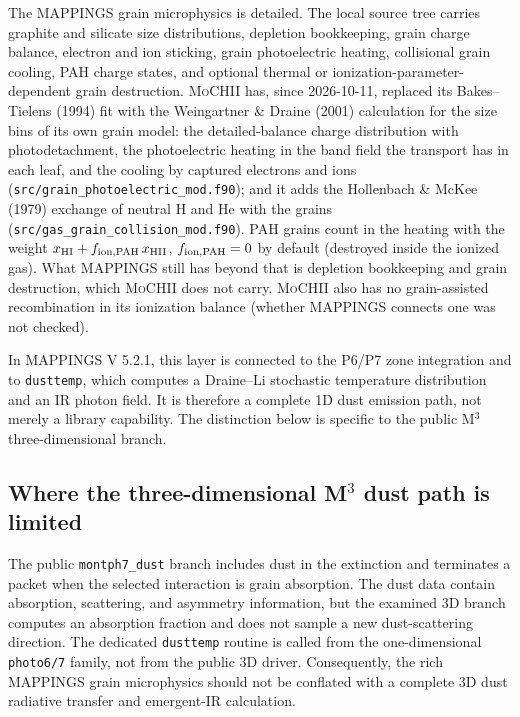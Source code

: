 \documentclass[english,a4paper]{my_memo}
\newcommand{\code}[1]{\texttt{#1}}
\newcommand{\MoCHII}{\textsc{MoCHII}}
\newcommand{\Mthree}{M$^3$}
\newcommand{\Mappings}{MAPPINGS V 5.2.1}
\begin{document}
The MAPPINGS grain microphysics is detailed.  The local source tree carries
graphite and silicate size distributions, depletion bookkeeping, grain
charge balance, electron and ion sticking, grain photoelectric heating,
collisional grain cooling, PAH charge states, and optional thermal or
ionization-parameter-dependent grain destruction.  \MoCHII{} has, since
2026-10-11, replaced its Bakes--Tielens (1994) fit with the Weingartner \&
Draine (2001) calculation for the size bins of its own grain model: the
detailed-balance charge distribution with photodetachment, the
photoelectric heating in the band field the transport has in each leaf, and
the cooling by captured electrons and ions (\code{src/grain\_photoelectric\_mod.f90});
and it adds the Hollenbach \& McKee (1979) exchange of neutral H and He with
the grains (\code{src/gas\_grain\_collision\_mod.f90}).  PAH grains count in
the heating with the weight $x_{\rm HI} + f_{\rm ion,PAH}\,x_{\rm HII}$,
$f_{\rm ion,PAH} = 0$ by default (destroyed inside the ionized gas).  What
MAPPINGS still has beyond that is depletion bookkeeping and grain
destruction, which \MoCHII{} does not carry.  \MoCHII{} also has no
grain-assisted recombination in its ionization balance (whether MAPPINGS
connects one was not checked).

In \Mappings{}, this layer is connected to the P6/P7 zone integration and
to \code{dusttemp}, which computes a Draine--Li stochastic temperature
distribution and an IR photon field.  It is therefore a complete 1D dust
emission path, not merely a library capability.  The distinction below is
specific to the public \Mthree{} three-dimensional branch.

\subsection{Where the three-dimensional \texorpdfstring{M$^3$}{M3} dust path is limited}

The public \code{montph7\_dust} branch includes dust in the extinction and
terminates a packet when the selected interaction is grain absorption.
The dust data contain absorption, scattering, and asymmetry information,
but the examined 3D branch computes an absorption fraction and does not
sample a new dust-scattering direction.  The dedicated \code{dusttemp}
routine is called from the one-dimensional \code{photo6/7} family, not
from the public 3D driver.  Consequently, the rich MAPPINGS grain
microphysics should not be conflated with a complete 3D dust radiative
transfer and emergent-IR calculation.
\end{document}
